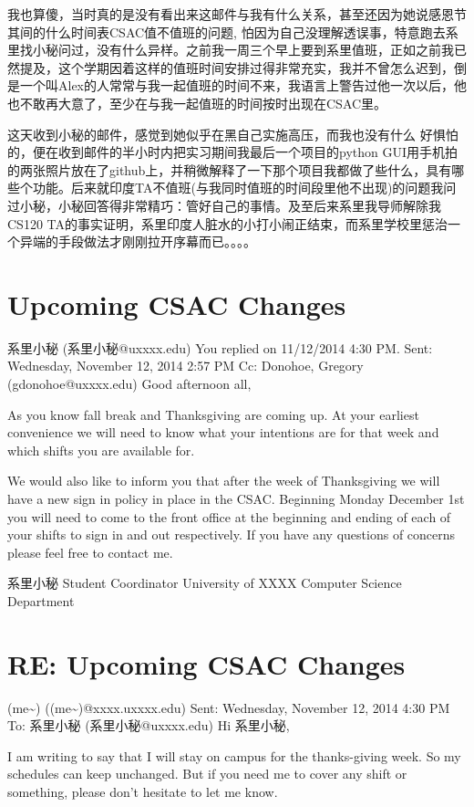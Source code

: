 \documentclass[12pt]{book}
\begin{document}
我也算傻，当时真的是没有看出来这邮件与我有什么关系，甚至还因为她说感恩节其间的什么时间表CSAC值不值班的问题, 怕因为自己没理解透误事，特意跑去系里找小秘问过，没有什么异样。之前我一周三个早上要到系里值班，正如之前我已然提及，这个学期因着这样的值班时间安排过得非常充实，我并不曾怎么迟到，倒是一个叫Alex的人常常与我一起值班的时间不来，我语言上警告过他一次以后，他也不敢再大意了，至少在与我一起值班的时间按时出现在CSAC里。

这天收到小秘的邮件，感觉到她似乎在黑自己实施高压，而我也没有什么 好惧怕的，便在收到邮件的半小时内把实习期间我最后一个项目的python GUI用手机拍的两张照片放在了github上，并稍微解释了一下那个项目我都做了些什么，具有哪些个功能。后来就印度TA不值班(与我同时值班的时间段里他不出现)的问题我问过小秘，小秘回答得非常精巧：管好自己的事情。及至后来系里我导师解除我CS120 TA的事实证明，系里印度人脏水的小打小闹正结束，而系里学校里惩治一个异端的手段做法才刚刚拉开序幕而已。。。。

\section{Upcoming CSAC Changes}
\label{sec-26-1}
系里小秘 (系里小秘@uxxxx.edu)
You replied on 11/12/2014 4:30 PM.
Sent:        Wednesday, November 12, 2014 2:57 PM
Cc:        
Donohoe, Gregory (gdonohoe@uxxxx.edu)
Good afternoon all,

As you know fall break and Thanksgiving are coming up. At your earliest convenience we will need to know what your intentions are for that week and which shifts you are available for.

We would also like to inform you that after the week of Thanksgiving we will have a new sign in policy in place in the CSAC. Beginning Monday December 1st you will need to come to the front office at the beginning and ending of each of your shifts to sign in and out respectively.
If you have any questions of concerns please feel free to contact me.


系里小秘
Student Coordinator
University of XXXX
Computer Science Department


\section{RE: Upcoming CSAC Changes}
\label{sec-26-2}
(me\textasciitilde{}) ((me\textasciitilde{})@xxxx.uxxxx.edu)
Sent:        Wednesday, November 12, 2014 4:30 PM
To:        
系里小秘 (系里小秘@uxxxx.edu)
Hi 系里小秘, 

I am writing to say that I will stay on campus for the thanks-giving week. So my schedules can keep unchanged. But if you need me to cover any shift or something, please don't hesitate to let me know. 
\end{document}
